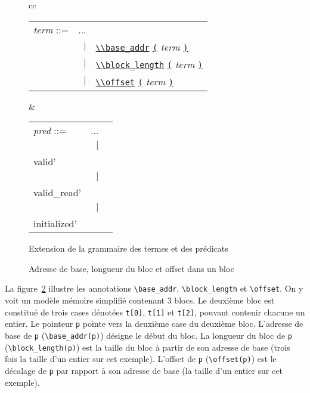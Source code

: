 \begin{figure}
  \centering
  \begin{tabular}{cc}
    \begin{tabular}{lrl}
      \textit{term} ::= & ... \\
      & $\mid$
      & \underline{\lstinline'\\base_addr'} \underline{\lstinline'('} \textit{term} \underline{\lstinline')'} \\
      & $\mid$
      & \underline{\lstinline'\\block_length'} \underline{\lstinline'('} \textit{term} \underline{\lstinline')'} \\
      & $\mid$
      & \underline{\lstinline'\\offset'} \underline{\lstinline'('} \textit{term} \underline{\lstinline')'} \\
    \end{tabular}
    &
    \begin{tabular}{lrl}
      \textit{pred} ::= & ... \\
      & $\mid$
      & \underline{\lstinline'\\valid'} \underline{\lstinline'('} \textit{term} \underline{\lstinline')'} \\
      & $\mid$
      & \underline{\lstinline'\\valid_read'} \underline{\lstinline'('} \textit{term} \underline{\lstinline')'} \\
      & $\mid$
      & \underline{\lstinline'\\initialized'} \underline{\lstinline'('} \textit{term} \underline{\lstinline')'} \\
    \end{tabular}
  \end{tabular}
  \caption{Extension de la grammaire des termes et des prédicats
    \label{fig:gram-ext}}
\end{figure}


\begin{figure}[bt]
  
  \caption{Adresse de base, longueur du bloc et offset dans un bloc}
  \label{fig:mem-annots}
\end{figure}


La figure~\ref{fig:mem-annots} illustre les annotations \lstinline{\base_addr},
\lstinline{\block_length} et \lstinline{\offset}.
On y voit un modèle mémoire simplifié contenant 3 blocs.
Le deuxième bloc est constitué de trois cases dénotées \lstinline't[0]',
\lstinline't[1]' et \lstinline't[2]', pouvant contenir chacune un entier.
Le pointeur \lstinline'p' pointe vers la deuxième case du deuxième bloc.
L'adresse de base de \lstinline'p' (\lstinline'\base_addr(p)') désigne le
début du bloc.
La longueur du bloc de \lstinline'p' (\lstinline'\block_length(p)') est la
taille du bloc à partir de son adresse de base (trois fois la taille d'un entier
sur cet exemple).
L'offset de \lstinline'p' (\lstinline'\offset(p)') est le décalage de
\lstinline'p' par rapport à son adresse de base (la taille d'un entier sur cet
exemple).


